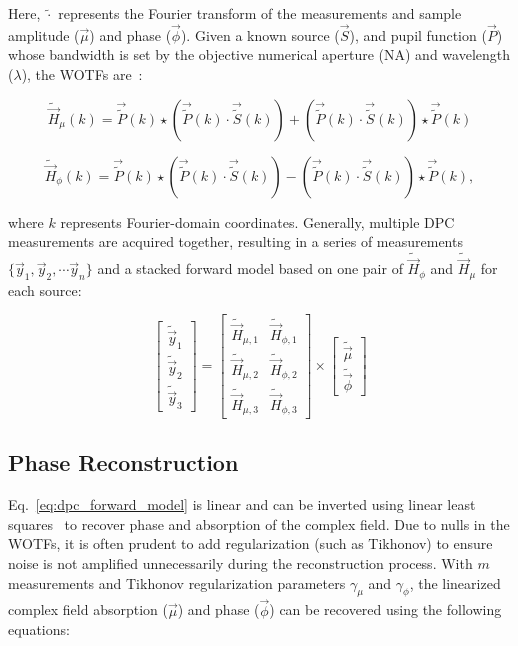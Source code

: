 \noindent Here, $\tilde{\cdot}$ represents the Fourier transform of the measurements and sample amplitude ($\vec{\mu}$) and phase ($\vec{\phi}$). Given a known source ($\vec{S}$), and pupil function ($\vec{P}$) whose bandwidth is set by the objective numerical aperture (NA) and wavelength ($\lambda$), the WOTFs are~\cite{Claus2015,tian2015quantitative}:

\begin{equation}\label{WOTF_re}
\tilde{\vec{H}}_{\mu}(k) = \vec{\tilde{P}}(k) \star (\vec{\tilde{P}}(k)\cdot \vec{\tilde{S}}(k))+ (\vec{\tilde{P}}(k) \cdot \vec{\tilde{S}}(k)) \star \vec{\tilde{P}}(k)
\end{equation}

\begin{equation}\label{WOTF_im}
\tilde{\vec{H}}_{\phi} (k) = \vec{\tilde{P}}(k) \star (\vec{\tilde{P}}(k)\cdot \vec{\tilde{S}}(k))- (\vec{\tilde{P}}(k) \cdot \vec{\tilde{S}}(k)) \star \vec{\tilde{P}}(k),
\end{equation}

\noindent where $k$ represents Fourier-domain coordinates. Generally, multiple DPC measurements are acquired together, resulting in a series of measurements $\{\vec{y}_1, \vec{y}_2, \cdots \vec{y}_n\}$ and a stacked forward model based on one pair of $\tilde{\vec{H}}_{\phi}$ and $\tilde{\vec{H}}_{\mu}$ for each source:

\begin{equation}
    \label{eq:dpc_forward_model}
    \begin{bmatrix}\tilde{\vec{y}}_1 \\ \tilde{\vec{y}}_2 \\ \tilde{\vec{y}}_3\end{bmatrix} = \begin{bmatrix}\tilde{\vec{H}}_{\mu, 1} & \tilde{\vec{H}}_{\phi, 1}\\ \tilde{\vec{H}}_{\mu, 2} & \tilde{\vec{H}}_{\phi, 2} \\ \tilde{\vec{H}}_{\mu, 3} & \tilde{\vec{H}}_{\phi, 3}\end{bmatrix} \times \begin{bmatrix}\tilde{\vec{\mu}} \\ \tilde{\vec{\phi}}\end{bmatrix}
\end{equation}

\subsection{Phase Reconstruction}
Eq.~\ref{eq:dpc_forward_model} is linear and can be inverted using linear least squares~\cite{tian2015quantitative} to recover phase and absorption of the complex field. Due to nulls in the WOTFs, it is often prudent to add regularization (such as Tikhonov) to ensure noise is not amplified unnecessarily during the reconstruction process. With $m$ measurements and Tikhonov regularization parameters $\gamma_{\mu}$ and $\gamma_{\phi}$, the linearized complex field absorption ($\vec{\mu}$) and phase ($\vec{\phi}$) can be recovered using the following equations:

